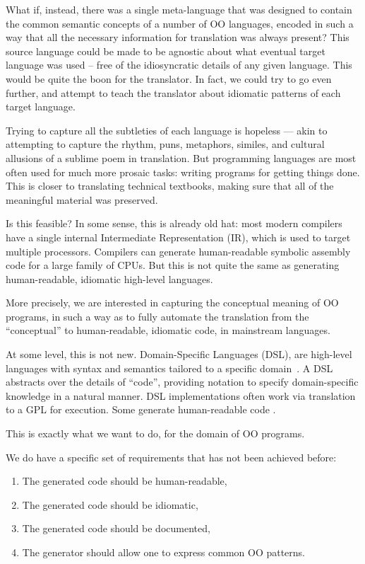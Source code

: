 \documentclass[sigplan,review,anonymous,prologue,dvipsnames]{acmart}
\begin{document}
What if, instead, there was a single meta-language that was designed to
contain the common semantic concepts of a number of OO languages, encoded
in such a way that all the necessary information for translation was always
present?  This source language could be made to be agnostic about what
eventual target language was used -- free of the idiosyncratic details of
any given language.  This would be quite the boon for the translator.
In fact, we could try to go even further, and attempt to teach the translator
about idiomatic patterns of each target language.

Trying to capture all the subtleties of each language is hopeless ---
akin to attempting to capture the rhythm, puns, metaphors, similes,
and cultural allusions of a sublime poem in translation.  But programming
languages are most often used for much more prosaic tasks: writing programs
for getting things done. This is closer to translating technical textbooks,
making sure that all of the meaningful material was preserved.

Is this feasible? In some sense, this is already old hat: most
modern compilers have a single internal Intermediate Representation (IR),
which is used to target multiple processors. Compilers can generate
human-readable symbolic assembly code for a large family of CPUs. But this
is not quite the same as generating human-readable, idiomatic high-level
languages.

More precisely, we are interested in capturing the conceptual meaning of
OO programs, in such a way as to fully automate the translation from
the ``conceptual'' to human-readable, idiomatic code, in mainstream
languages.

At some level, this is not new.  Domain-Specific Languages (DSL),
are high-level languages with syntax and semantics tailored to a specific
domain~\cite{mernik2005and}.  A DSL
abstracts over the details of ``code'', providing notation to
specify domain-specific knowledge in a natural manner. DSL implementations
often work via translation to a GPL for execution.  Some generate
human-readable code \cite{wang1997zephyr, mooij2013gaining, hong2012green, 
beyak2011saga}.

This is exactly what we want to do, for the domain of OO programs.

We do have a specific set of requirements that has not been achieved
before:
\begin{enumerate}
\item The generated code should be human-readable,
\item The generated code should be idiomatic,
\item The generated code should be documented,
\item The generator should allow one to express common OO patterns.
\end{enumerate}
\end{document}
